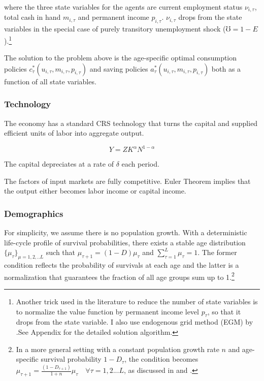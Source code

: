 where the three state variables for the agents are current employment status $\nu_{i,\tau}$,  total cash in hand $m_{i,\tau}$ and permanent income $p_{i,\tau}$.  $\nu_{i,\tau}$ drops from the state variables in the special case of purely transitory unemployment shock ($\mho = 1-E$).\footnote{Another trick used in the literature to reduce the number of state variables is to normalize the value function by permanent income level $p_\tau$, so that it drops from the state variable. I also use endogenous grid method (EGM) by \cite{carroll2006method}.See Appendix for the detailed solution algorithm.}

The solution to the problem above is the age-specific optimal consumption policies  $c_\tau^*(u_{i,\tau},m_{i,\tau},p_{i,\tau})$ and saving policies $a_\tau^*(u_{i,\tau},m_{i,\tau},p_{i,\tau})$ both as a function of all state variables. 

\subsubsection{Technology}

The economy has a standard CRS technology that turns the capital and supplied efficient units of labor into aggregate output. 

\begin{equation}
    Y = Z K^{\alpha} N^{1-\alpha}
\end{equation}

The capital depreciates at a rate of $\delta$ each period. 

The factors of input markets are fully competitive. Euler Theorem implies that the output either becomes labor income or capital income. 


\subsubsection{Demographics}

For simplicity, we assume there is no population growth. With a deterministic life-cycle profile of survival probabilities, there exists a stable age distribution $\{\mu_\tau \}_{\mu=1,2,..L}$ such that $\mu_{\tau+1} = (1-D)\mu_{\tau}$ and $\sum^{L}_{\tau=1}\mu_{\tau} = 1$. The former condition reflects the probability of survivals at each age and the latter is a normalization that guarantees the fraction of all age groups sum up to 1.\footnote{In a more general setting with a constant population growth rate $n$ and age-specific survival probability $1-D_\tau$, the condition becomes $\mu_{\tau+1} = \frac{(1-D_{\tau+1})}{1+n}\mu_{\tau}\quad \forall \tau = 1, 2...L$, as discussed in \cite{rios1996life} and \cite{huggett1996wealth}.}


